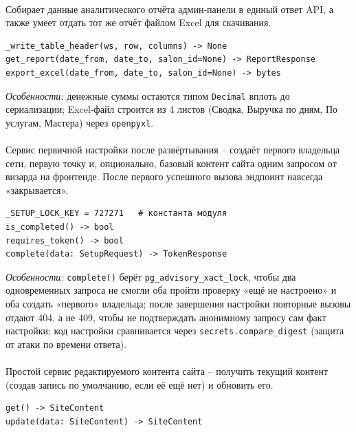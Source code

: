 \paragraph{}
Собирает данные аналитического отчёта админ-панели в единый ответ API, а
также умеет отдать тот же отчёт файлом Excel для скачивания.
\begin{verbatim}
_write_table_header(ws, row, columns) -> None
get_report(date_from, date_to, salon_id=None) -> ReportResponse
export_excel(date_from, date_to, salon_id=None) -> bytes
\end{verbatim}
\textit{Особенности:} денежные суммы остаются типом \texttt{Decimal}
вплоть до сериализации; Excel-файл строится из 4 листов (Сводка, Выручка
по дням, По услугам, Мастера) через \texttt{openpyxl}.

\paragraph{}
Сервис первичной настройки после развёртывания -- создаёт первого
владельца сети, первую точку и, опционально, базовый контент сайта одним
запросом от визарда на фронтенде. После первого успешного вызова
эндпоинт навсегда «закрывается».
\begin{verbatim}
_SETUP_LOCK_KEY = 727271   # константа модуля
is_completed() -> bool
requires_token() -> bool
complete(data: SetupRequest) -> TokenResponse
\end{verbatim}
\textit{Особенности:} \texttt{complete()} берёт
\texttt{pg_advisory_xact_lock}, чтобы два одновременных запроса не
смогли оба пройти проверку «ещё не настроено» и оба создать «первого»
владельца; после завершения настройки повторные вызовы отдают 404, а не
409, чтобы не подтверждать анонимному запросу сам факт настройки; код
настройки сравнивается через \texttt{secrets.compare_digest} (защита от
атаки по времени ответа).

\paragraph{}
Простой сервис редактируемого контента сайта -- получить текущий контент
(создав запись по умолчанию, если её ещё нет) и обновить его.
\begin{verbatim}
get() -> SiteContent
update(data: SiteContent) -> SiteContent
\end{verbatim}


